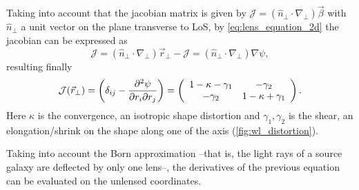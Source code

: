 Taking into account that the jacobian matrix is given by $\mathcal{J}=(\hat n_\perp\cdot\nabla_\perp)\vec\beta$ with $\hat n_\perp$ a unit vector on the plane transverse to LoS, by \autoref{eq:lens_equation_2d} the jacobian can be expressed as
\begin{equation}
\mathcal{J} = (\hat n_\perp\cdot\nabla_\perp)\vec r_\perp-\mathcal{J} = (\hat n_\perp\cdot\nabla_\perp)\nabla\psi,
\end{equation}
resulting finally 
\begin{equation}
\mathcal{J}(\vec r_\perp) = \left(\delta_{ij}-\frac{\partial^2\psi}{\partial r_i\partial r_j}\right)=\left( \begin{array}{c c}1-\kappa-\gamma_1 & -\gamma_2\\-\gamma_2 & 1-\kappa+\gamma_1\end{array} \right).
\label{eq:jacobian}
\end{equation}
Here $\kappa$ is the convergence, an isotropic shape distortion and $\gamma_1,\gamma_2$ is the shear, an elongation/shrink on the shape along one of the axis (\autoref{fig:wl_distortion}).
\newline

Taking into account the Born approximation --that is, the light rays of a source galaxy are deflected by only one lens--, the derivatives of the previous equation can be evaluated on the unlensed coordinates.

